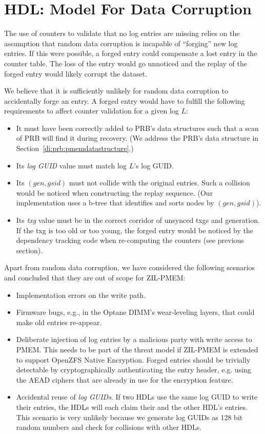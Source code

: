 \documentclass[12pt,a4paper,twoside]{book}
\begin{document}
\section{HDL: Model For Data Corruption}\label{di:prb:modeldatacorruption}
The use of counters to validate that no log entries are missing relies on the assumption that random data corruption is incapable of ``forging'' new log entries.
If this were possible, a forged entry could compensate a lost entry in the counter table.
The loss of the entry would go unnoticed and the replay of the forged entry would likely corrupt the dataset.

We believe that it is sufficiently unlikely for random data corruption to accidentally forge an entry.
A forged entry would have to fulfill the following requirements to affect counter validation for a given log $L$:
\begin{itemize}[noitemsep]
    \item It must have been correctly added to PRB's data structures such that a scan of PRB will find it during recovery.
        (We address the PRB's data structure in Section~\ref{di:prb:pmemdatastructure}.)
    \item Its \textit{log GUID} value must match log $L$'s log GUID.
    \item Its $(gen, gsid)$ must not collide with the original entries.
        Such a collision would be noticed when constructing the replay sequence.
        (Our implementation uses a b-tree that identifies and sorts nodes by $(gen, gsid)$).
    \item Its \textit{txg} value must be in the correct corridor of unsynced txgs and generation.
        If the txg is too old or too young, the forged entry would be noticed by the dependency tracking code when re-computing the counters (see previous section).
\end{itemize}

Apart from random data corruption, we have considered the following scenarios and concluded that they are out of scope for ZIL-PMEM:
\begin{itemize}[noitemsep]
\item Implementation errors on the write path.
\item Firmware bugs, e.g., in the Optane DIMM's wear-leveling layers, that could make old entries re-appear.
\item Deliberate injection of log entries by a malicious party with write access to PMEM.
    This needs to be part of the threat model if ZIL-PMEM is extended to support OpenZFS Native Encryption.
    Forged entries should be trivially detectable by cryptographically authenticating the entry header, e.g. using the AEAD ciphers that are already in use for the encryption feature.
\item Accidental reuse of \textit{log GUIDs}.
    If two HDLs use the same log GUID to write their entries, the HDLs will each claim their and the other HDL's entries.
    This scenario is very unlikely because we generate log GUIDs as 128 bit random numbers and check for collisions with other HDLs.
\end{itemize}
\end{document}
